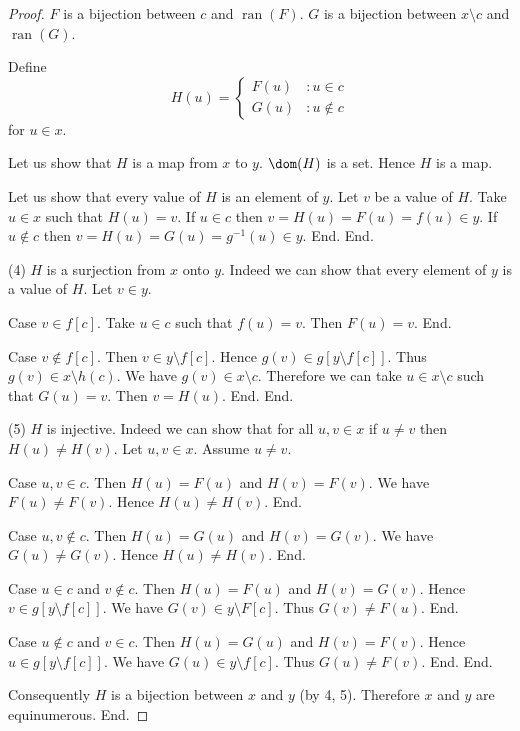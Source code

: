 \documentclass{article}
\newcommand{\range}{\operatorname{ran}}
\newcommand{\inv}[1]{#1^{-1}}
\begin{document}
\begin{forthel}
\begin{proof}
        $F$ is a bijection between $c$ and $\range(F)$.
        $G$ is a bijection between $x \setminus c$ and $\range(G)$.

        Define \[ H(u) =
          \begin{cases}
            F(u) & : u \in c \\
            G(u) & : u \notin c
          \end{cases} \]
        for $u \in x$.

        Let us show that $H$ is a map from $x$ to $y$.
          $\dom(H)$ is a set.
          Hence $H$ is a map.

          Let us show that every value of $H$ is an element of $y$.
            Let $v$ be a value of $H$.
            Take $u \in x$ such that $H(u) = v$.
            If $u \in c$ then $v = H(u) = F(u) = f(u) \in y$.
            If $u \notin c$ then $v = H(u) = G(u) = \inv{g}(u) \in y$.
          End.
        End.

        (4) $H$ is a surjection from $x$  onto $y$.
        Indeed we can show that every element of $y$ is a value of $H$.
          Let $v \in y$.

          Case $v \in f[c]$.
            Take $u \in c$ such that $f(u) = v$.
            Then $F(u) = v$.
          End.

          Case $v \notin f[c]$.
            Then $v \in y \setminus f[c]$.
            Hence $g(v) \in g[y \setminus f[c]]$.
            Thus $g(v) \in x \setminus h(c)$.
            We have $g(v) \in x \setminus c$.
            Therefore we can take $u \in x \setminus c$ such that $G(u) = v$.
            Then $v = H(u)$.
          End.
        End.

        (5) $H$ is injective.
        Indeed we can show that for all $u, v \in x$ if $u \neq v$ then
        $H(u) \neq H(v)$.
          Let $u,v \in x$.
          Assume $u \neq v$.

          Case $u,v \in c$.
            Then $H(u) = F(u)$ and $H(v) = F(v)$.
            We have $F(u) \neq F(v)$.
            Hence $H(u) \neq H(v)$.
          End.

          Case $u,v \notin c$.
            Then $H(u) = G(u)$ and $H(v) = G(v)$.
            We have $G(u) \neq G(v)$.
            Hence $H(u) \neq H(v)$.
          End.

          Case $u \in c$ and $v \notin c$.
            Then $H(u) = F(u)$ and $H(v) = G(v)$.
            Hence $v \in g[y \setminus f[c]]$.
            We have $G(v) \in y \setminus F[c]$.
            Thus $G(v) \neq F(u)$.
          End.

          Case $u \notin c$ and $v \in c$.
            Then $H(u) = G(u)$ and $H(v) = F(v)$.
            Hence $u \in g[y \setminus f[c]]$.
            We have $G(u) \in y \setminus f[c]$.
            Thus $G(u) \neq F(v)$.
          End.
        End.

        Consequently $H$ is a bijection between $x$ and $y$ (by 4, 5).
        Therefore $x$ and $y$ are equinumerous.
      End.
    \end{proof}
  \end{forthel}
\end{document}
